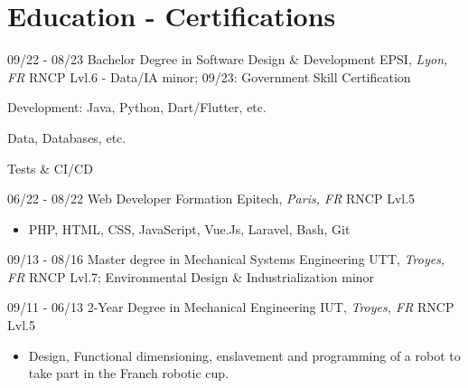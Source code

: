 \documentclass[]{friggeri-cv}
\begin{document}
\section{Education - Certifications}
\vspace*{-0.25cm}
\vspace{0.5mm}
\begin{entrylist}
  \entry
    {09/22 - 08/23}
    {Bachelor Degree in Software Design \& Development}
    {EPSI, \textit{Lyon, FR}}
    {RNCP Lvl.6 - Data/IA minor; \hspace{7mm} 09/23: Government Skill Certification}
\end{entrylist}
\vspace*{-0.65cm}
\begin{itemize}
\setlength{\itemsep}{1pt}
\setlength{\parskip}{0pt}
\setlength{\parsep}{0pt}
\begin{multicols}{2}
\item Development: \newline Java, Python, Dart/Flutter, etc.
\columnbreak
\item Data, Databases, etc.
\item Tests \& CI/CD
\end{multicols}
\end{itemize}\vspace{0.5mm}
\begin{entrylist}
  \entry
    {06/22 - 08/22}
    {Web Developer Formation}
    {Epitech, \textit{Paris, FR}}
    {RNCP Lvl.5}
\end{entrylist}

\vspace*{-0.35cm}
\begin{itemize}
\setlength{\itemsep}{1pt}
\setlength{\parskip}{0pt}
\setlength{\parsep}{0pt}

\item PHP, HTML, CSS, JavaScript, Vue.Js, Laravel, Bash, Git
\end{itemize}\vspace{0.5mm}
\begin{entrylist}
  \entry
    {09/13 - 08/16}
    {Master degree in Mechanical Systems Engineering}
    {UTT, \textit{Troyes, FR}}
    {RNCP Lvl.7; Environmental Design \& Industrialization minor}
\end{entrylist}
\vspace{0.5mm}
\begin{entrylist}
  \entry
    {09/11 - 06/13}
    {2-Year Degree in Mechanical Engineering}
    {IUT, \textit{Troyes, FR}}
    {RNCP Lvl.5}
\end{entrylist}
\vspace*{-0.4cm}
\begin{itemize}
\setlength{\itemsep}{1pt}
\setlength{\parskip}{0pt}
\setlength{\parsep}{0pt}
\item Design, Functional dimensioning, enslavement and programming of a robot to take part in the Franch robotic cup.
\end{itemize}
\end{document}
